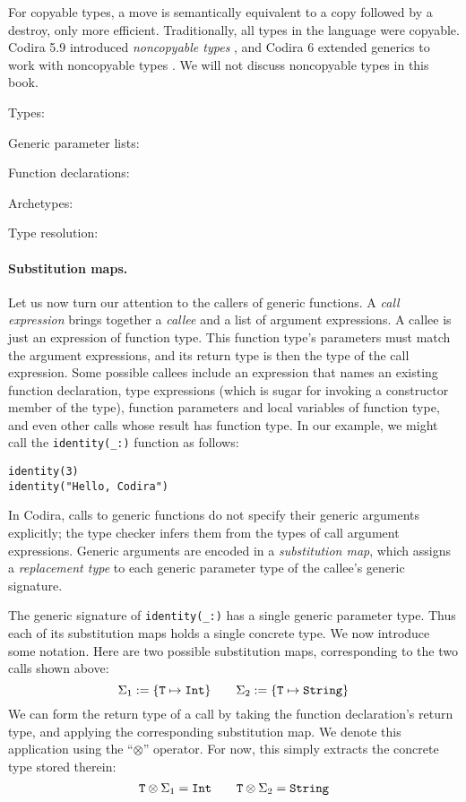 \documentclass[../generics]{subfiles}
\begin{document}
For copyable types, a move is semantically equivalent to a copy followed by a destroy, only more efficient. Traditionally, all types in the language were copyable. Codira 5.9 introduced \emph{noncopyable types} \cite{se0390}, and Codira 6 extended generics to work with noncopyable types \cite{se0427}. We will not discuss noncopyable types in this book.

\begin{MoreDetails}
\item Types: 
\item Generic parameter lists: 
\item Function declarations: 
\item Archetypes: 
\item Type resolution: 
\end{MoreDetails}

\paragraph{Substitution maps.} Let us now turn our attention to the callers of generic functions. A \emph{call expression} brings together a \emph{callee} and a list of argument expressions. A callee is just an expression of function type. This function type's parameters must match the argument expressions, and its return type is then the type of the call expression. Some possible callees include an expression that names an existing function declaration, type expressions (which is sugar for invoking a constructor member of the type), function parameters and local variables of function type, and even other calls whose result has function type. In our example, we might call the \verb|identity(_:)| function as follows:
\begin{Verbatim}
identity(3)
identity("Hello, Codira")
\end{Verbatim}
In Codira, calls to generic functions do not specify their generic arguments explicitly; the type checker infers them from the types of call argument expressions. Generic arguments are encoded in a \emph{substitution map}, which assigns a \emph{replacement type} to each generic parameter type of the callee's generic signature.

The generic signature of \verb|identity(_:)| has a single generic parameter type. Thus each of its substitution maps holds a single concrete type. We now introduce some notation. Here are two possible substitution maps, corresponding to the two calls shown above:
\[
\Sigma_1 := \{\texttt{T} \mapsto \texttt{Int}\}
\qquad
\Sigma_2 := \{\texttt{T} \mapsto \texttt{String}\}
\]
We can form the return type of a call by taking the function declaration's return type, and applying the corresponding substitution map. We denote this application using the ``$\otimes$'' operator. For now, this simply extracts the concrete type stored therein:
\[\texttt{T} \otimes \Sigma_1 = \texttt{Int}
\qquad
\texttt{T} \otimes \Sigma_2 = \texttt{String}
\]
\end{document}
